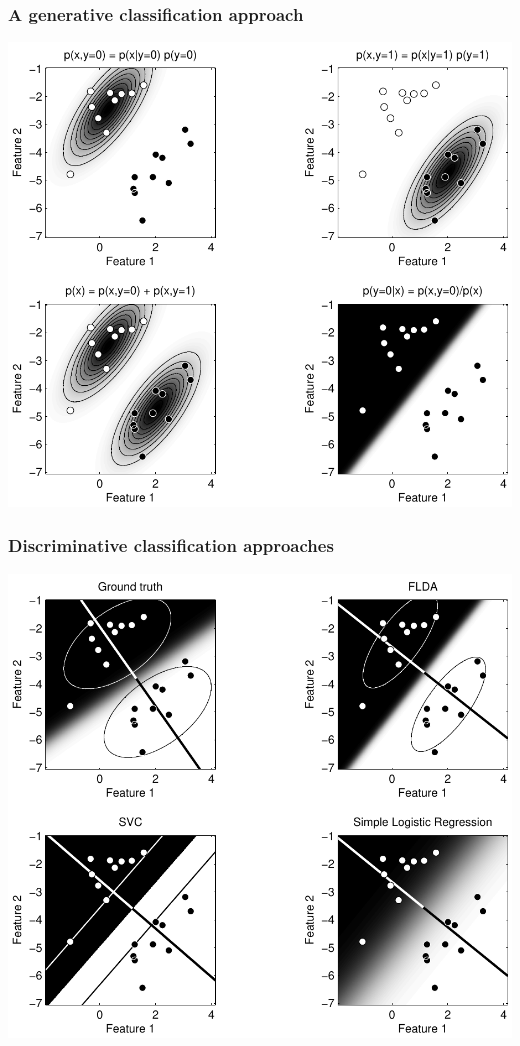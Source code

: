 \begin{frame}
\frametitle{A generative classification approach}
\begin{center}
\includegraphics[height=.8\textheight]{fld}
\end{center}
\end{frame}

\begin{frame}
\frametitle{Discriminative classification approaches}
\begin{center}
\includegraphics[height=.8\textheight]{linear_discrimination}
\end{center}
\end{frame}

